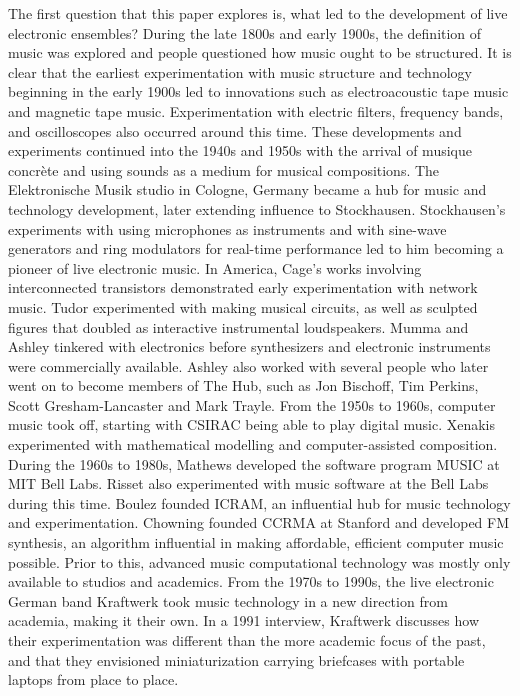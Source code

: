 \documentclass[letterpaper, 12pt]{article}
\begin{document}
%
The first question that this paper explores is, what led to the development of live electronic ensembles?
%
During the late 1800s and early 1900s, the definition of music was explored and people questioned how music ought to be structured.
%
It is clear that the earliest experimentation with music structure and technology beginning in the early 1900s led to innovations such as electroacoustic tape music and magnetic tape music.
%
Experimentation with electric filters, frequency bands, and oscilloscopes also occurred around this time.
%
These developments and experiments continued into the 1940s and 1950s with the arrival of musique concrète and using sounds as a medium for musical compositions.
%
The Elektronische Musik studio in Cologne, Germany became a hub for music and technology development, later extending influence to Stockhausen.
%
Stockhausen's experiments with using microphones as instruments and with sine-wave generators and ring modulators for real-time performance led to him becoming a pioneer of live electronic music.
%
In America, Cage's works involving interconnected transistors demonstrated early experimentation with network music.
%
Tudor experimented with making musical circuits, as well as sculpted figures that doubled as interactive instrumental loudspeakers.
%
Mumma and Ashley tinkered with electronics before synthesizers and electronic instruments were commercially available.
%
Ashley also worked with several people who later went on to become members of The Hub, such as Jon Bischoff, Tim Perkins, Scott Gresham-Lancaster and Mark Trayle.
%
From the 1950s to 1960s, computer music took off, starting with CSIRAC being able to play digital music.
%
Xenakis experimented with mathematical modelling and computer-assisted composition.
%
During the 1960s to 1980s, Mathews developed the software program MUSIC at MIT Bell Labs.
%
Risset also experimented with music software at the Bell Labs during this time.
%
Boulez founded ICRAM, an influential hub for music technology and experimentation.
%
Chowning founded CCRMA at Stanford and developed FM synthesis, an algorithm influential in making affordable, efficient computer music possible.
%
Prior to this, advanced music computational technology was mostly only available to studios and academics.
%
From the 1970s to 1990s, the live electronic German band Kraftwerk took music technology in a new direction from academia, making it their own.
%
In a 1991 interview, Kraftwerk discusses how their experimentation was different than the more academic focus of the past, and that they envisioned miniaturization carrying briefcases with portable laptops from place to place.
\end{document}
